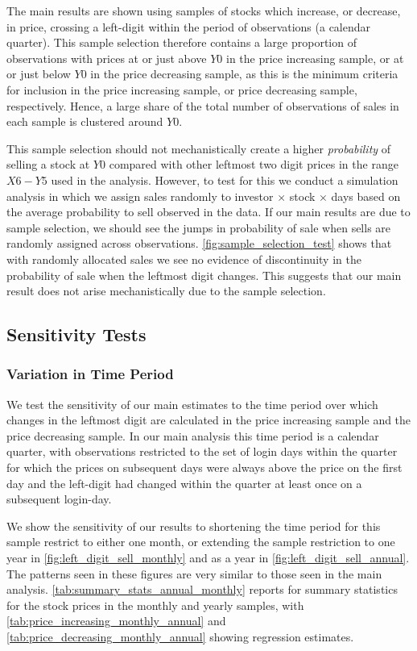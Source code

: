 The main results are shown using samples of stocks which increase, or decrease, in price, crossing a left-digit within the period of observations (a calendar quarter). This sample selection therefore contains a large proportion of observations with prices at or just above $Y0$ in the price increasing sample, or at or just below $Y0$ in the price decreasing sample, as this is the minimum criteria for inclusion in the price increasing sample, or price decreasing sample, respectively. Hence, a large share of the total number of observations of sales in each sample is clustered around $Y0$.

This sample selection should not mechanistically create a higher \textit{probability} of selling a stock at $Y0$ compared with other leftmost two digit prices in the range $X6 - Y5$ used in the analysis. However, to test for this we conduct a simulation analysis in which we assign sales randomly to investor $\times$ stock $\times$ days based on the average probability to sell observed in the data. If our main results are due to sample selection, we should see the jumps in probability of sale when sells are randomly assigned across observations. \ref{fig:sample_selection_test} shows that with randomly allocated sales we see no evidence of discontinuity in the probability of sale when the leftmost digit changes. This suggests that our main result does not arise mechanistically due to the sample selection.

\subsection{Sensitivity Tests}

\subsubsection{Variation in Time Period}

We test the sensitivity of our main estimates to the time period over which changes in the leftmost digit are calculated in the price increasing sample and the price decreasing sample. In our main analysis this time period is a calendar quarter, with observations restricted to the set of login days within the quarter for which the prices on subsequent days were always above the price on the first day and the left-digit had changed within the quarter at least once on a subsequent login-day. 

We show the sensitivity of our results to shortening the time period for this sample restrict to either one month, or extending the sample restriction to one year in \ref{fig:left_digit_sell_monthly} and as a year in \ref{fig:left_digit_sell_annual}. The patterns seen in these figures are very similar to those seen in the main analysis. \ref{tab:summary_stats_annual_monthly} reports for summary statistics for the stock prices in the monthly and yearly samples, with \ref{tab:price_increasing_monthly_annual} and \ref{tab:price_decreasing_monthly_annual} showing regression estimates.

